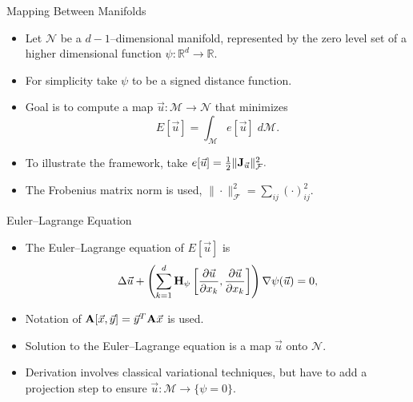 \documentclass{beamer}
\begin{document}
\begin{frame}{Mapping Between Manifolds}
\begin{itemize}
\item Let $\mathcal{N}$ be a $d-1$--dimensional manifold, represented by the zero level set of a higher dimensional function $\psi : \mathbb{R}^d \rightarrow \mathbb{R}.$  
\item For simplicity take $\psi$ to be a signed distance function.
\item Goal is to compute a map $\vec{u} : \mathcal{M} \rightarrow \mathcal{N}$ that minimizes $$E[\vec{u}]= \int_{\mathcal{M}}  e[\vec{u}]\; d\mathcal{M}. $$
\item To illustrate the framework, take $e[\vec{u}] = \frac{1}{2} \| {\bf J}_{\vec{u}}\|^2_{\mathcal{F}}.$  %
\item The Frobenius matrix norm is used, $\| \cdot \|^2_{\mathcal{F}} = \sum_{ij} (\cdot)^2_{ij}.$
\end{itemize}
\end{frame}

\begin{frame}{Euler--Lagrange Equation}
\begin{itemize}
\item The Euler--Lagrange equation of $E[\vec{u}]$ is 
\begin{equation*}
\Delta \vec{u} + \left( \sum_{k=1}^d {\bf H}_{\psi} \left[\frac{\partial \vec{u}}{\partial x_k} ,\frac{\partial \vec{u}}{\partial x_k}\right] \right) \nabla \psi(\vec{u}) =0,
\end{equation*}
\item Notation of ${\bf A} [\vec{x},\vec{y}] = \vec{y}^T {\bf A} \vec{x}$ is used.
\item Solution to the Euler--Lagrange equation is a map $\vec{u}$ onto $\mathcal{N}.$
\item Derivation involves classical variational techniques, but have to add a projection step to ensure $\vec{u} :\mathcal{M} \rightarrow \lbrace \psi =0 \rbrace.$
\end{itemize}
\end{frame}
\end{document}
